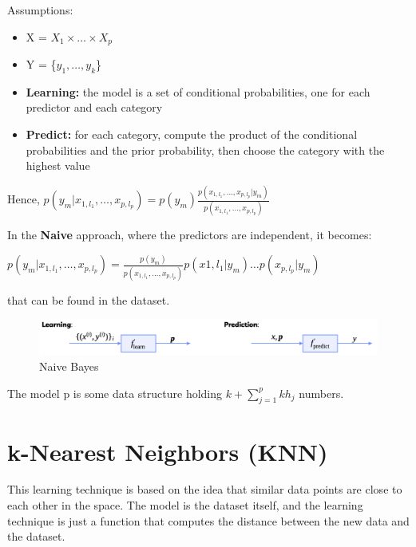 Assumptions:
\begin{itemize}
    \item X = $X_1 \times \dots \times X_p$
    \item Y = \{$y_1, \dots, y_k$\}
\end{itemize}

\begin{definitionblock}
    \begin{itemize}
        \item \textbf{Learning:} the model is a set of conditional probabilities, one for each predictor and each category
        \item \textbf{Predict:} for each category, compute the product of the conditional probabilities and the prior probability, then choose the category with the highest value
    \end{itemize}
\end{definitionblock}

Hence, $p(y_m | x_{1,l_1},\dots,x_{p,l_p}) = p(y_m)\frac{p(x_{1,l_1},\dots,x_{p,l_p} | y_m)}{p(x_{1,l_1},\dots,x_{p,l_p})}$

In the \textbf{Naive} approach, where the predictors are independent, it becomes:

$p(y_m | x_{1,l_1},\dots,x_{p,l_p}) = \frac{p(y_m)}{p(x_{1,l_1},\dots,x_{p,l_p})}p(x{1,l_1} | y_m) \dots p(x_{p,l_p} | y_m)$

that can be found in the dataset.

\begin{figure}[H]
    \centering
    \includegraphics[width=1\textwidth]{assets/fig32.png}
    \caption{Naive Bayes}
\end{figure}

The model p is some data structure holding $k + \sum_{j=1}^{p}kh_j$ numbers.

\section{k-Nearest Neighbors (KNN)}

This learning technique is based on the idea that similar data points are close to each other in the space. The model is the dataset itself, and the learning technique is just a function that computes the distance between the new data and the dataset.

